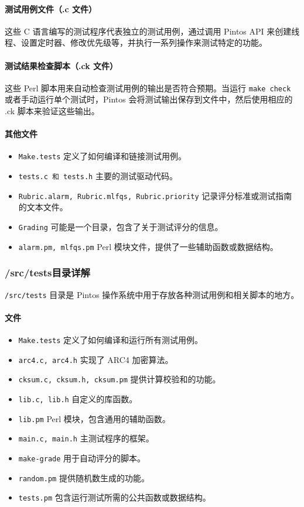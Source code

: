 \documentclass{article}
\begin{document}
\paragraph{测试用例文件（.c 文件）}
这些 C 语言编写的测试程序代表独立的测试用例，通过调用 Pintos API 来创建线程、设置定时器、修改优先级等，并执行一系列操作来测试特定的功能。

\paragraph{测试结果检查脚本（.ck 文件）}
这些 Perl 脚本用来自动检查测试用例的输出是否符合预期。当运行 \texttt{make check} 或者手动运行单个测试时，Pintos 会将测试输出保存到文件中，然后使用相应的 .ck 脚本来验证这些输出。

\paragraph{其他文件}
\begin{itemize}
	\item \texttt{Make.tests} 定义了如何编译和链接测试用例。
	\item \texttt{tests.c 和 tests.h} 主要的测试驱动代码。
	\item \texttt{Rubric.alarm, Rubric.mlfqs, Rubric.priority} 记录评分标准或测试指南的文本文件。
	\item \texttt{Grading} 可能是一个目录，包含了关于测试评分的信息。
	\item \texttt{alarm.pm, mlfqs.pm} Perl 模块文件，提供了一些辅助函数或数据结构。
\end{itemize}

\subsubsection{/src/tests目录详解}
\texttt{/src/tests} 目录是 Pintos 操作系统中用于存放各种测试用例和相关脚本的地方。

\paragraph{文件}
\begin{itemize}
	\item \texttt{Make.tests} 定义了如何编译和运行所有测试用例。
	\item \texttt{arc4.c, arc4.h} 实现了 ARC4 加密算法。
	\item \texttt{cksum.c, cksum.h, cksum.pm} 提供计算校验和的功能。
	\item \texttt{lib.c, lib.h} 自定义的库函数。
	\item \texttt{lib.pm} Perl 模块，包含通用的辅助函数。
	\item \texttt{main.c, main.h} 主测试程序的框架。
	\item \texttt{make-grade} 用于自动评分的脚本。
	\item \texttt{random.pm} 提供随机数生成的功能。
	\item \texttt{tests.pm} 包含运行测试所需的公共函数或数据结构。
\end{itemize}
\end{document}
